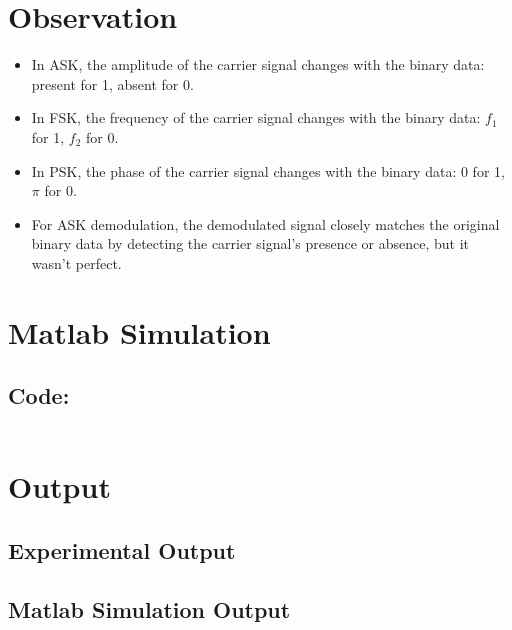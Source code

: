 \documentclass[12pt]{article}
\begin{document}
\section*{Observation}
\begin{itemize}
    \item In ASK, the amplitude of the carrier signal changes with the binary data: present for 1, absent for 0.
    \item In FSK, the frequency of the carrier signal changes with the binary data: \( f_1 \) for 1, \( f_2 \) for 0.
    \item In PSK, the phase of the carrier signal changes with the binary data: 0 for 1, \( \pi \) for 0.
    \item For ASK demodulation, the demodulated signal closely matches the original binary data by detecting the carrier signal's presence or absence, but it wasn't perfect.
\end{itemize}


\section*{Matlab Simulation}

\subsection*{Code:}
\inputminted[linenos,breaklines,breakanywhere]{matlab}{./assets/dsk.m}

\section*{Output}

\subsection*{Experimental Output}


\subsection*{Matlab Simulation Output}

\end{document}
